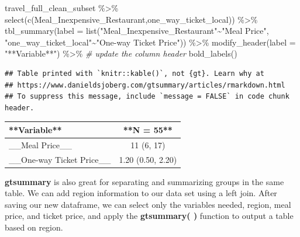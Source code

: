 \documentclass[
]{book}
\newenvironment{Shaded}{\begin{snugshade}}{\end{snugshade}}
\newcommand{\AttributeTok}[1]{\textcolor[rgb]{0.77,0.63,0.00}{#1}}
\newcommand{\CommentTok}[1]{\textcolor[rgb]{0.56,0.35,0.01}{\textit{#1}}}
\newcommand{\FunctionTok}[1]{\textcolor[rgb]{0.00,0.00,0.00}{#1}}
\newcommand{\NormalTok}[1]{#1}
\newcommand{\SpecialCharTok}[1]{\textcolor[rgb]{0.00,0.00,0.00}{#1}}
\newcommand{\StringTok}[1]{\textcolor[rgb]{0.31,0.60,0.02}{#1}}
\begin{document}
\begin{Shaded}
\begin{Highlighting}[]
\NormalTok{travel\_full\_clean\_subset }\SpecialCharTok{\%\textgreater{}\%}
  \FunctionTok{select}\NormalTok{(}\FunctionTok{c}\NormalTok{(Meal\_Inexpensive\_Restaurant,one\_way\_ticket\_local)) }\SpecialCharTok{\%\textgreater{}\%}
  \FunctionTok{tbl\_summary}\NormalTok{(}\AttributeTok{label =} \FunctionTok{list}\NormalTok{(}\StringTok{"Meal\_Inexpensive\_Restaurant"}\SpecialCharTok{\textasciitilde{}}\StringTok{"Meal Price"}\NormalTok{,}
                           \StringTok{"one\_way\_ticket\_local"}\SpecialCharTok{\textasciitilde{}}\StringTok{"One{-}way Ticket Price"}\NormalTok{)) }\SpecialCharTok{\%\textgreater{}\%}
  \FunctionTok{modify\_header}\NormalTok{(}\AttributeTok{label =} \StringTok{"**Variable**"}\NormalTok{) }\SpecialCharTok{\%\textgreater{}\%} \CommentTok{\# update the column header}
  \FunctionTok{bold\_labels}\NormalTok{() }
\end{Highlighting}
\end{Shaded}

\begin{verbatim}
## Table printed with `knitr::kable()`, not {gt}. Learn why at
## https://www.danieldsjoberg.com/gtsummary/articles/rmarkdown.html
## To suppress this message, include `message = FALSE` in code chunk header.
\end{verbatim}

\begin{tabular}{l|c}
\hline
**Variable** & **N = 55**\\
\hline
\_\_Meal Price\_\_ & 11 (6, 17)\\
\hline
\_\_One-way Ticket Price\_\_ & 1.20 (0.50, 2.20)\\
\hline
\end{tabular}

\textbf{gtsummary} is also great for separating and summarizing groups in the same table. We can add region information to our data set using a left join. After saving our new dataframe, we can select only the variables needed, region, meal price, and ticket price, and apply the \textbf{gtsummary( )} function to output a table based on region.
\end{document}
